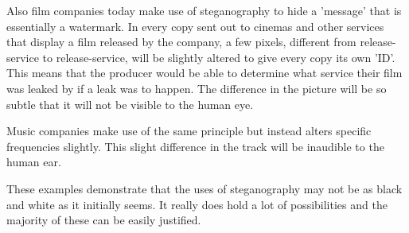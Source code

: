 Also film companies today make use of steganography to hide a 'message' that is essentially a watermark. In every copy sent out to cinemas and other services that display a film released by the company, a few pixels, different from release-service to release-service, will be slightly altered to give every copy its own 'ID'.
This means that the producer would be able to determine what service their film was leaked by if a leak was to happen.
The difference in the picture will be so subtle that it will not be visible to the human eye.

Music companies make use of the same principle but instead alters specific frequencies slightly. This slight difference in the track will be inaudible to the human ear. \cite{Anderson1998}


These examples demonstrate that the uses of steganography may not be as black and white as it initially seems. It really does hold a lot of possibilities and the majority of these can be easily justified.

